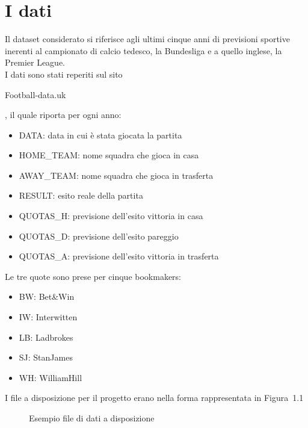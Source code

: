 \section{I dati}
Il dataset considerato si riferisce agli ultimi cinque anni di previsioni sportive 
inerenti al campionato di calcio tedesco,
la Bundesliga e a quello inglese, la Premier League.\\
\newline
I dati sono stati reperiti sul sito  \begin{it}Football-data.uk\end{it}, il quale riporta per ogni anno:
\begin{itemize}
 \item DATA: data in cui \`e stata giocata la partita
 \item HOME\_TEAM: nome squadra che gioca in casa
 \item AWAY\_TEAM: nome squadra che gioca in trasferta
 \item RESULT: esito reale della partita
 \item QUOTAS\_H: previsione dell'esito vittoria in casa
 \item QUOTAS\_D: previsione dell'esito pareggio
 \item QUOTAS\_A: previsione dell'esito vittoria in trasferta
\end{itemize}
 Le tre quote sono prese per cinque bookmakers:
\begin{itemize}
 \item BW: Bet\&Win
 \item IW: Interwitten
 \item LB: Ladbrokes
 \item SJ: StanJames
 \item WH: WilliamHill
\end{itemize}
\newpage
\vspace{1.5cm}
I file a disposizione per il progetto erano nella forma rappresentata in Figura~1.1\\
\vspace{1.5cm}
\begin{figure}
 \caption{Esempio file di dati a disposizione}
 \label{fig:dati}
\end{figure}


